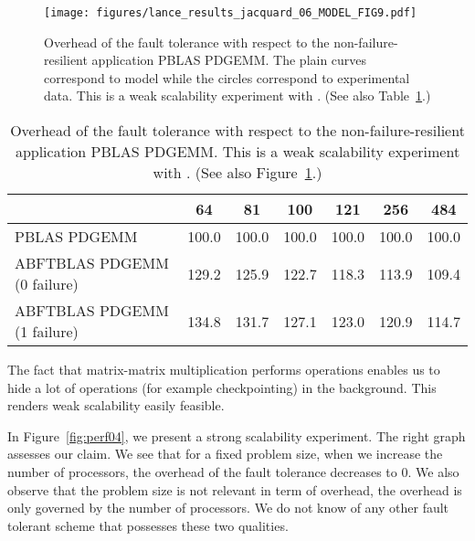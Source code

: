 \documentclass[pdftex,11pt]{article}
\begin{document}
\begin{figure}
  \begin{center}
    \texttt{[image: figures/lance\_results\_jacquard\_06\_MODEL\_FIG9.pdf]}
  \end{center}
  \color{DodgerBlue4}
  \caption{\label{fig:perf03} \color{black} Overhead of the fault
    tolerance with respect to the non-failure-resilient application
    PBLAS PDGEMM.  The plain curves correspond to model while the
    circles correspond to experimental data.  This is a weak
    scalability experiment with .  (See also
    Table~\ref{tab:perf03}.)  }
\end{figure}

\begin{table}
  \begin{center}
    \begin{tabular}{|l||c|c|c|c|c|c|}
      \hline
      &   64        &   81        &  100        &  121        &  256        &  484        \\
      \hline
      PBLAS PDGEMM                &  100.0      &  100.0      &  100.0      &  100.0      &  100.0      &  100.0      \\
      ABFTBLAS PDGEMM (0 failure) &  129.2      &  125.9      &  122.7      &  118.3      &  113.9      &  109.4      \\
      ABFTBLAS PDGEMM (1 failure) &  134.8      &  131.7      &  127.1      &  123.0      &  120.9      &  114.7      \\
      \hline
    \end{tabular}
  \end{center}
  \color{DodgerBlue4}
  \caption{\label{tab:perf03}
    \color{black}
    Overhead of the fault tolerance with respect to the non-failure-resilient application PBLAS PDGEMM.
    This is a weak scalability experiment with .
    (See also Figure~\ref{fig:perf03}.)
  }
\end{table}

The fact that matrix-matrix multiplication performs  operations
enables us to hide a lot of  operations (for example
checkpointing) in the background.  This renders weak scalability
easily feasible.

In Figure~\ref{fig:perf04}, we present a strong scalability
experiment.  The right graph assesses our claim. We see that for a
fixed problem size, when we increase the number of processors, the
overhead of the fault tolerance decreases to 0. We also observe that
the problem size is not relevant in term of overhead, the overhead is
only governed by the number of processors. We do not know of any other
fault tolerant scheme that possesses these two qualities.
\end{document}
